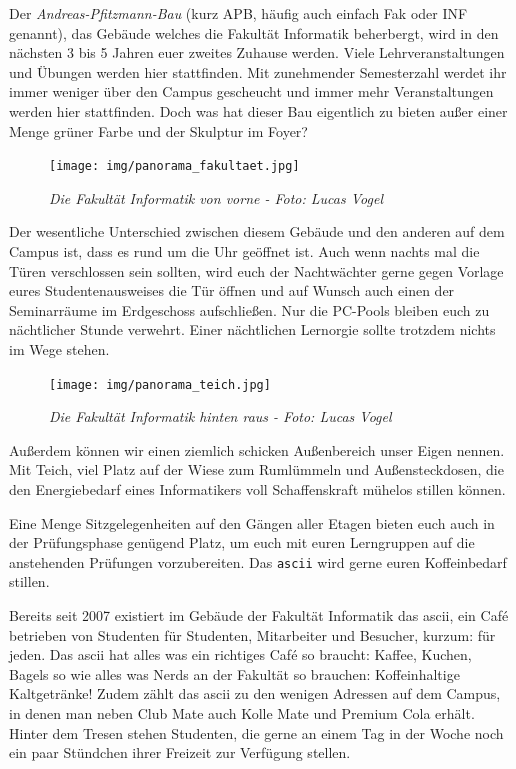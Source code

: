 
Der \emph{Andreas-Pfitzmann-Bau} (kurz APB, häufig auch einfach \glqq{}Fak\grqq{} oder INF genannt), das Gebäude welches die Fakultät Informatik beherbergt, wird in den nächsten 3 bis 5 Jahren euer zweites Zuhause werden.
Viele Lehrveranstaltungen und Übungen werden hier stattfinden. Mit zunehmender Semesterzahl werdet ihr immer weniger über den Campus gescheucht und immer mehr Veranstaltungen werden hier stattfinden.
Doch was hat dieser Bau eigentlich zu bieten außer einer Menge grüner Farbe und der Skulptur im Foyer?

\begin{figure}[h!]
\centering
\texttt{[image: img/panorama\_fakultaet.jpg]}
\caption*{\small \textit{Die Fakultät Informatik von vorne - Foto: Lucas Vogel}}
\end{figure}

Der wesentliche Unterschied zwischen diesem Gebäude und den anderen auf dem Campus ist, dass es rund um die Uhr geöffnet ist. Auch wenn nachts mal die Türen verschlossen sein sollten, wird euch der Nachtwächter gerne gegen Vorlage eures Studentenausweises die Tür öffnen und auf Wunsch auch einen der Seminarräume im Erdgeschoss aufschließen. Nur die PC-Pools bleiben euch zu nächtlicher Stunde verwehrt.
Einer nächtlichen Lernorgie sollte trotzdem nichts im Wege stehen.

\begin{figure}[h!]
\centering
\texttt{[image: img/panorama\_teich.jpg]}
\caption*{\small \textit{Die Fakultät Informatik hinten raus - Foto: Lucas Vogel}}
\end{figure}

Außerdem können wir einen ziemlich schicken Außenbereich unser Eigen nennen. Mit Teich, viel Platz auf der Wiese zum Rumlümmeln und Außensteckdosen, die den Energiebedarf eines Informatikers voll Schaffenskraft mühelos stillen können.

Eine Menge Sitzgelegenheiten auf den Gängen aller Etagen bieten euch auch in der Prüfungsphase genügend Platz, um euch mit euren Lerngruppen auf die anstehenden Prüfungen vorzubereiten. Das \texttt{ascii} wird gerne euren Koffeinbedarf stillen.


Bereits seit 2007 existiert im Gebäude der Fakultät Informatik das ascii, ein Café betrieben von Studenten für Studenten, Mitarbeiter und Besucher, kurzum: für jeden.
Das ascii hat alles was ein richtiges Café so braucht: Kaffee, Kuchen, Bagels so wie alles was Nerds an der Fakultät so brauchen: Koffeinhaltige Kaltgetränke!
Zudem zählt das ascii zu den wenigen Adressen auf dem Campus, in denen man neben Club Mate auch Kolle Mate und Premium Cola erhält.
Hinter dem Tresen stehen Studenten, die gerne an einem Tag in der Woche noch ein paar Stündchen ihrer Freizeit zur Verfügung stellen.

